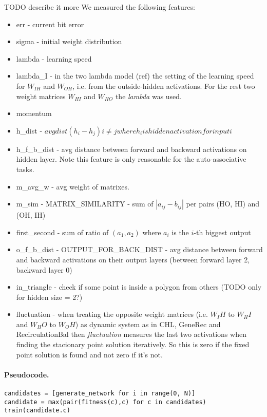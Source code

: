 TODO describe it more
We measured the following features: 
\begin{itemize} 
\item err - current bit error 
\item sigma - initial weight distribution 
\item lambda - learning speed 
\item lambda\_I - in the two lambda model (ref) the setting of the learning speed for $W_{IH}$ and $W_{OH}$, i.e. from the outside-hidden activations. For the rest two weight matrices $W_{HI}$ and $W_{HO}$ the \emph{lambda} was used. 
\item momentum
\item h\_dist - $avg dist(h_i - h_j) i \neq j where h_i is   hidden activation for input i$
\item h\_f\_b\_dist - avg distance between forward and backward activations on hidden layer. Note this feature is only reasonable for the auto-associative tasks. 
\item m\_avg\_w - avg weight of matrixes. 
\item m\_sim - MATRIX\_SIMILARITY - sum of $|a_{ij} - b_{ij}|$ per pairs (HO, HI) and (OH, IH) 
\item first\_second - sum of ratio of $(a_1, a_2)$ where $a_i$ is the $i$-th biggest output 
\item	o\_f\_b\_dist - OUTPUT\_FOR\_BACK\_DIST - avg distance between forward and backward activations on their output layers (between forward layer 2, backward layer 0) 
\item in\_triangle - check if some point is inside a polygon from others (TODO only for hidden size = 2?)
\item fluctuation - when treating the opposite weight matrices (i.e. $W_IH$ to $W_HI$ and $W_HO$ to $W_OH$) as dynamic system as in CHL, GeneRec and RecirculationBal then \emph{fluctuation} measures the last two activations when finding the stacionary point solution iteratively. So this is zero if the fixed point solution is found and not zero if it's not. 


\end{itemize} 

\paragraph{Pseudocode.} 
\begin{lstlisting} 
candidates = [generate_network for i in range(0, N)] 
candidate = max(pair(fitness(c),c) for c in candidates) 
train(candidate.c) 
\end{lstlisting} 


